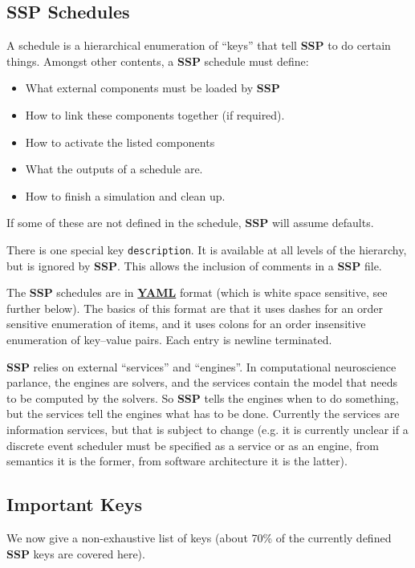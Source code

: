 \documentclass[12pt]{article}
\begin{document}
\subsection*{SSP Schedules}

A schedule is a hierarchical enumeration of ``keys'' that tell {\bf SSP} to do certain things. Amongst other contents, a {\bf SSP} schedule must define:
\begin{itemize}
\item What external components must be loaded by {\bf SSP}
\item How to link these components together (if required).
\item How to activate the listed components
\item What the outputs of a schedule are.
\item How to finish a simulation and clean up.
\end{itemize}
If some of these are not defined in the schedule, {\bf SSP} will assume defaults.

There is one special key {\tt description}. It is available at all levels of the hierarchy, but is ignored by {\bf SSP}. This allows the inclusion of comments in a {\bf SSP} file.

The {\bf SSP} schedules are in \href{http://fdik.org/yml/}{\bf YAML} format (which is white space sensitive, see further below). The basics of this format are that it uses dashes for an order sensitive enumeration of items, and it uses colons for an order insensitive enumeration of key--value pairs. Each entry is newline terminated.

{\bf SSP} relies on external ``services'' and ``engines''. In computational neuroscience parlance, the engines are solvers, and the services contain the model that needs to be computed by the solvers. So {\bf SSP} tells the engines when to do something, but the services tell the engines what has to be done. Currently the services are information services, but that is subject to change (e.g. it is currently unclear if a discrete event scheduler must be specified as a service or as an engine, from semantics it is the former, from software architecture it is the latter).

\subsection*{Important Keys}

We now give a non-exhaustive list of keys (about 70\% of the currently defined {\bf SSP} keys are covered here).
\end{document}

